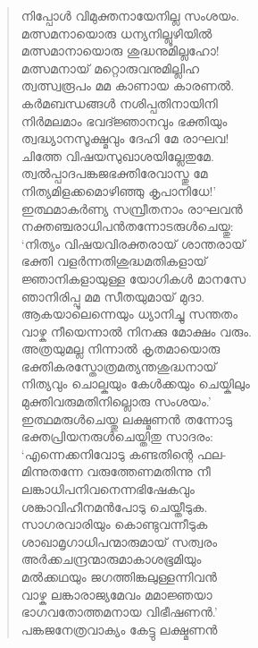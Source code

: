 \begin{verse}
നിപ്പോള്‍ വിമുക്തനായേനില്ല സംശയം.\\
മത്സമനായൊരു ധന്യനില്ലൂഴിയില്‍\\
മത്സമാനായൊരു ശുദ്ധനുമില്ലഹോ!\\
മത്സമനായ് മറ്റൊരുവനുമില്ലിഹ\\
ത്വത്സ്വരൂപം മമ കാണായ കാരണല്‍.\\
കര്‍മബന്ധങ്ങള്‍ നശിപ്പതിനായിനി\\
നിര്‍മലമാം ഭവദ്ജ്ഞാനവും ഭക്തിയും\\
ത്വദ്ധ്യാനസൂക്ഷ്മവും ദേഹി മേ രാഘവ!\\
ചിത്തേ വിഷയസുഖാശയില്ലേതുമേ.\\
ത്വല്‍പ്പാദപങ്കജഭക്തിരേവാസ്തു മേ\\
നിത്യമിളക്കമൊഴിഞ്ഞു കൃപാനിധേ!’\\
ഇത്ഥമാകര്‍ണ്യ സമ്പ്രീതനാം രാഘവന്‍\\
നക്തഞ്ചരാധിപന്‍തന്നോടരുള്‍ചെയ്തു:\\
‘നിത്യം വിഷയവിരക്തരായ് ശാന്തരായ്\\
ഭക്തി വളര്‍ന്നതിശുദ്ധമതികളായ്\\
ജ്ഞാനികളായുള്ള യോഗികള്‍ മാനസേ\\
ഞാനിരിപ്പൂ മമ സീതയുമായ് മുദാ.\\
ആകയാലെന്നെയും ധ്യാനിച്ചു സന്തതം\\
വാഴ്ക നീയെന്നാല്‍ നിനക്കു മോക്ഷം വരും.\\
അത്രയുമല്ല നിന്നാല്‍ കൃതമായൊരു\\
ഭക്തികരസ്തോത്രമത്യന്തശുദ്ധനായ്\\
നിത്യവും ചൊല്കയും കേള്‍ക്കയും ചെയ്കിലും\\
മുക്തിവരുമതിനില്ലൊരു സംശയം.’\\
ഇത്ഥമരുള്‍ചെയ്തു ലക്ഷ്മണന്‍ തന്നോടു\\
ഭക്തപ്രിയനരുള്‍ചെയ്തിതു സാദരം:\\
‘എന്നെക്കനിവോടു കണ്ടതിന്റെ ഫല-\\
മിന്നുതന്നേ വരുത്തേണമതിന്നു നീ\\
ലങ്കാധിപനിവനെന്നഭിഷേകവും\\
ശങ്കാവിഹീനമന്‍പോടു ചെയ്തീടുക.\\
സാഗരവാരിയും കൊണ്ടുവന്നീടുക\\
ശാഖാമൃഗാധിപന്മാരുമായ് സത്വരം\\
അര്‍ക്കചന്ദ്രന്മാരുമാകാശഭൂമിയും\\
മല്‍ക്കഥയും ജഗത്തിങ്കലുള്ളന്നിവന്‍\\
വാഴ്ക ലങ്കാരാജ്യമേവം മമാജ്ഞയാ\\
ഭാഗവതോത്തമനായ വിഭീഷണന്‍.’\\
പങ്കജനേത്രവാക്യം കേട്ടു ലക്ഷ്മണന്‍\\

\end{verse}
